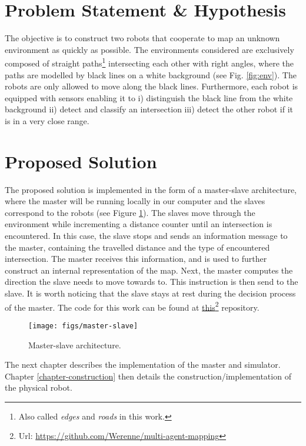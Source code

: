\documentclass[12pt]{report}
\begin{document}
\section{Problem Statement \& Hypothesis}
The objective is to construct two robots that cooperate to map an unknown environment as quickly as possible. The environments considered are exclusively composed of straight paths\footnote{Also called \textit{edges} and \textit{roads} in this work.} intersecting each other with right angles, where the paths are modelled by black lines on a white background (see Fig. \ref{fig:env}). The robots are only allowed to move along the black lines. Furthermore, each robot is equipped with sensors enabling it to i) distinguish the black line from the white background ii) detect and classify an intersection iii) detect the other robot if it is in a very close range.

\section{Proposed Solution}
The proposed solution is implemented in the form of a master-slave architecture, where the master will be running locally in our computer and the slaves correspond to the robots (see Figure \ref{fig:master-slave}). The slaves move through the environment while incrementing a distance counter until an intersection is encountered. In this case, the slave stops and sends an information message to the master, containing the travelled distance and the type of encountered intersection. The master receives this information, and is used to further construct an internal representation of the map. Next, the master computes the direction the slave needs to move towards to. This instruction is then send to the slave. It is worth noticing that the slave stays at rest during the decision process of the master. The code for this work can be found at \href{https://github.com/Werenne/multi-agent-mapping}{this}\footnote{Url: \url{https://github.com/Werenne/multi-agent-mapping}} repository.

\begin{figure}[!h]
\centering
\texttt{[image: figs/master-slave]}
\caption{Master-slave architecture.}
\label{fig:master-slave}
\end{figure}

The next chapter describes the implementation of the master and simulator. Chapter \ref{chapter-construction} then details the construction/implementation of the physical robot. 
\end{document}
